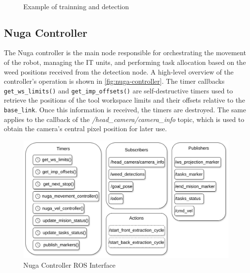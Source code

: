 \begin{figure}[htb]
    \myfloatalign
     \quad
     \\
    \caption{Example of trainning and detection}\label{fig:rumex-example}
\end{figure}

\subsection{Nuga Controller}
The Nuga controller is the main node responsible for orchestrating the movement of the robot, managing the \ac{IT} units, and performing task allocation based on the weed positions received from the detection node. A high-level overview of the controller's operation is shown in \autoref{fig:nuga-controller}. The timer callbacks \texttt{get\_ws\_limits()} and \texttt{get\_imp\_offsets()} are self-destructive timers used to retrieve the positions of the tool workspace limits and their offsets relative to the \texttt{base\_link}. Once this information is received, the timers are destroyed. The same applies to the callback of the \textit{/head\_camera/camera\_info} topic, which is used to obtain the camera’s central pixel position for later use.

\begin{figure}[ht]
    \centering
    \includegraphics[width=0.95\linewidth]{gfx/ch02/nuga_controller.png}
    \caption{Nuga Controller ROS Interface}
    \label{fig:nuga-controller}
\end{figure}

